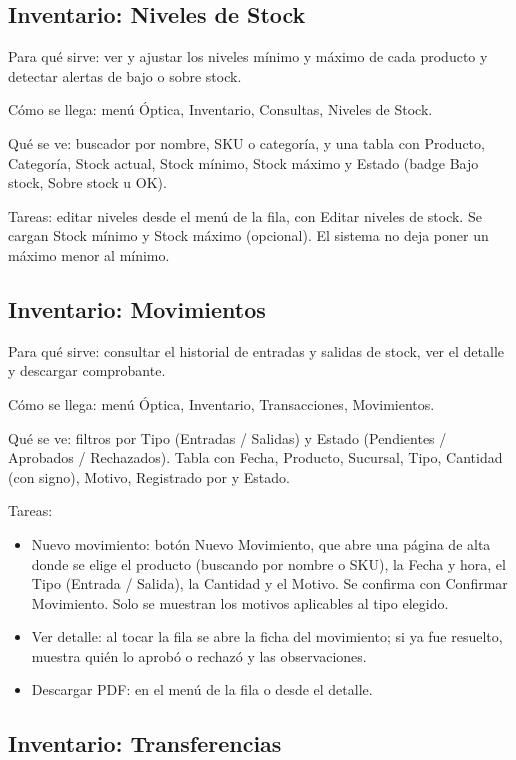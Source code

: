 \subsection{Inventario: Niveles de Stock}
\label{sec:mu-inventario-niveles}

Para qué sirve: ver y ajustar los niveles mínimo y máximo de cada producto y detectar alertas de bajo o sobre stock.

Cómo se llega: menú Óptica, Inventario, Consultas, Niveles de Stock.

Qué se ve: buscador por nombre, SKU o categoría, y una tabla con Producto, Categoría, Stock actual, Stock mínimo, Stock máximo y Estado (badge Bajo stock, Sobre stock u OK).

Tareas: editar niveles desde el menú de la fila, con Editar niveles de stock. Se cargan Stock mínimo y Stock máximo (opcional). El sistema no deja poner un máximo menor al mínimo.

\subsection{Inventario: Movimientos}
\label{sec:mu-inventario-movimientos}

Para qué sirve: consultar el historial de entradas y salidas de stock, ver el detalle y descargar comprobante.

Cómo se llega: menú Óptica, Inventario, Transacciones, Movimientos.

Qué se ve: filtros por Tipo (Entradas / Salidas) y Estado (Pendientes / Aprobados / Rechazados). Tabla con Fecha, Producto, Sucursal, Tipo, Cantidad (con signo), Motivo, Registrado por y Estado.

Tareas:
\begin{itemize}
  \item Nuevo movimiento: botón Nuevo Movimiento, que abre una página de alta donde se elige el producto (buscando por nombre o SKU), la Fecha y hora, el Tipo (Entrada / Salida), la Cantidad y el Motivo. Se confirma con Confirmar Movimiento. Solo se muestran los motivos aplicables al tipo elegido.
  \item Ver detalle: al tocar la fila se abre la ficha del movimiento; si ya fue resuelto, muestra quién lo aprobó o rechazó y las observaciones.
  \item Descargar PDF: en el menú de la fila o desde el detalle.
\end{itemize}

\subsection{Inventario: Transferencias}
\label{sec:mu-inventario-transferencias}


